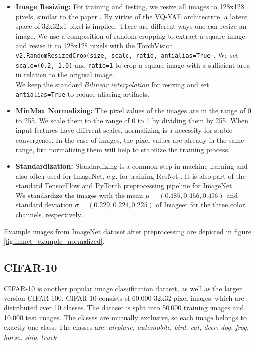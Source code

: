 \documentclass[10pt,a4paper,twoside]{article}
\begin{document}
    \begin{itemize}
        \item \textbf{Image Resizing:} For training and testing, we resize all images to 128x128 pixels, similar to the paper \cite{vqvae}. By virtue of the VQ-VAE architecture, a latent space of 32x32x1 pixel is implied.
        There are different ways one can resize an image. We use a composition of random cropping to extract a square image and resize it to 128x128 pixels with the TorchVision \texttt{v2.RandomResizedCrop(size, scale, ratio, antialias=True)}. We set \texttt{scale=(0.2, 1.0)} and \texttt{ratio=1} to crop a square image with a sufficient area in relation to the original image.\\
        We keep the standard \textit{Bilinear interpolation} for resizing and set \texttt{antialias=True} to reduce aliasing artifacts.

        \item \textbf{MinMax Normalizing:} The pixel values of the images are in the range of 0 to 255. We scale them to the range of 0 to 1 by dividing them by 255. When input features have different scales, normalizing is a necessity for stable convergence. In the case of images, the pixel values are already in the same range, but normalizing them will help to stabilize the training process.

        \item \textbf{Standardization:} Standardizing is a common step in machine learning and also often used for ImageNet, e.g. for training ResNet \cite{resnet}. It is also part of the standard TensorFlow and PyTorch preprocessing pipeline for ImageNet. \\
        We standardize the images with the mean $\mu = (0.485, 0.456, 0.406)$ and standard deviation $\sigma = (0.229, 0.224, 0.225)$ of Imageet for the three color channels, respectively.
    
    \end{itemize}

    Example images from ImageNet dataset after preprocessing are depicted in figure \ref{fig:imnet_example_normalized}.

    \subsection{CIFAR-10}
    CIFAR-10 \cite{cifar10} is another popular image classification dataset, as well as the larger version CIFAR-100. CIFAR-10 consists of 60.000 32x32 pixel images, which are distributed over 10 classes. The dataset is split into 50.000 training images and 10.000 test images. The classes are mutually exclusive, so each image belongs to exactly one class. The classes are: \textit{airplane, automobile, bird, cat, deer, dog, frog, horse, ship, truck}
\end{document}
